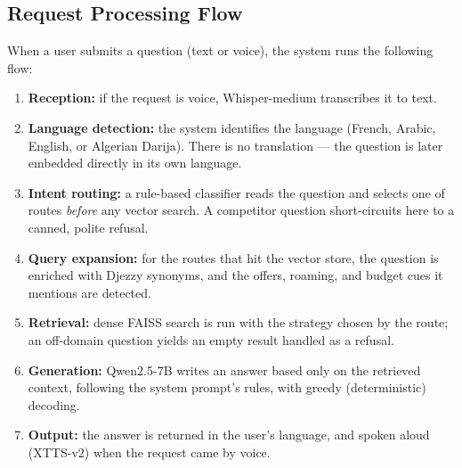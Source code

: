 \documentclass[12pt, a4paper]{report}
\newcommand{\humantext}[1]{#1}      %
\begin{document}
\subsection{Request Processing Flow}
\humantext{When a user submits a question (text or voice), the system runs the following flow:}

\begin{enumerate}[noitemsep]
    \item \humantext{\textbf{Reception:} if the request is voice, Whisper-medium transcribes it to text.}
    \item \humantext{\textbf{Language detection:} the system identifies the language (French, Arabic, English, or Algerian Darija). There is no translation --- the question is later embedded directly in its own language.}
    \item \humantext{\textbf{Intent routing:} a rule-based classifier reads the question and selects one of \numRoutes{} routes \emph{before} any vector search. A competitor question short-circuits here to a canned, polite refusal.}
    \item \humantext{\textbf{Query expansion:} for the routes that hit the vector store, the question is enriched with Djezzy synonyms, and the offers, roaming, and budget cues it mentions are detected.}
    \item \humantext{\textbf{Retrieval:} dense FAISS search is run with the strategy chosen by the route; an off-domain question yields an empty result handled as a refusal.}
    \item \humantext{\textbf{Generation:} Qwen2.5-7B writes an answer based only on the retrieved context, following the system prompt's \numRules{} rules, with greedy (deterministic) decoding.}
    \item \humantext{\textbf{Output:} the answer is returned in the user's language, and spoken aloud (XTTS-v2) when the request came by voice.}
\end{enumerate}
\end{document}
